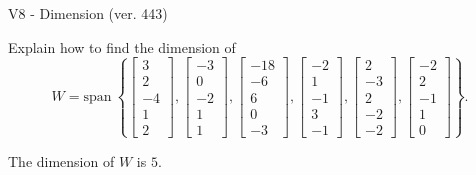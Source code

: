 \begin{exercise}
  \begin{exerciseTitle}V8 - Dimension (ver. 443)\end{exerciseTitle}
  \begin{exerciseStatement}
    Explain how to find the dimension of 
\[W=\mathrm{span}\ \left\{\left[\begin{array}{r}
3 \\
2 \\
-4 \\
1 \\
2
\end{array}\right] , \left[\begin{array}{r}
-3 \\
0 \\
-2 \\
1 \\
1
\end{array}\right] , \left[\begin{array}{r}
-18 \\
-6 \\
6 \\
0 \\
-3
\end{array}\right] , \left[\begin{array}{r}
-2 \\
1 \\
-1 \\
3 \\
-1
\end{array}\right] , \left[\begin{array}{r}
2 \\
-3 \\
2 \\
-2 \\
-2
\end{array}\right] , \left[\begin{array}{r}
-2 \\
2 \\
-1 \\
1 \\
0
\end{array}\right]\right\}.\]



  \end{exerciseStatement}
  \begin{exerciseAnswer}
   The dimension of \(W\) is  \(5\).
  


  \end{exerciseAnswer}
\end{exercise}